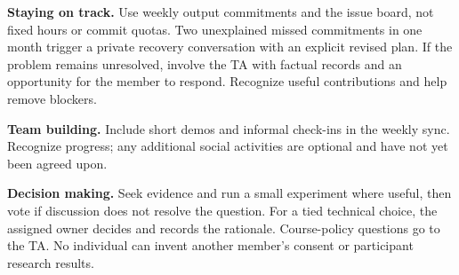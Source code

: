 \documentclass[11pt]{article}
\begin{document}
\textbf{Staying on track.} Use weekly output commitments and the issue board, not
fixed hours or commit quotas. Two unexplained missed commitments in one month
trigger a private recovery conversation with an explicit revised plan. If the
problem remains unresolved, involve the TA with factual records and an opportunity
for the member to respond. Recognize useful contributions and help remove blockers.

\textbf{Team building.} Include short demos and informal check-ins in the weekly
sync. Recognize progress; any additional social activities are optional and have
not yet been agreed upon.

\textbf{Decision making.} Seek evidence and run a small experiment where useful,
then vote if discussion does not resolve the question. For a tied technical
choice, the assigned owner decides and records the rationale. Course-policy
questions go to the TA. No individual can invent another member's consent or
participant research results.

\clearpage


\end{document}
